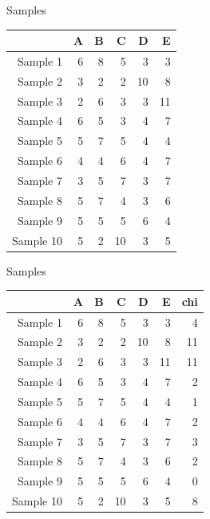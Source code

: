 \documentclass{beamer}
\begin{document}
\begin{frame}{Samples}

\begin{table}[ht]
\centering
\begin{tabular}{rrrrrr}
  \hline
 & A & B & C & D & E \\ 
  \hline
Sample 1 & 6 & 8 & 5 & 3 & 3 \\ 
  Sample 2 & 3 & 2 & 2 & 10 & 8 \\ 
  Sample 3 & 2 & 6 & 3 & 3 & 11 \\ 
  Sample 4 & 6 & 5 & 3 & 4 & 7 \\ 
  Sample 5 & 5 & 7 & 5 & 4 & 4 \\ 
  Sample 6 & 4 & 4 & 6 & 4 & 7 \\ 
  Sample 7 & 3 & 5 & 7 & 3 & 7 \\ 
  Sample 8 & 5 & 7 & 4 & 3 & 6 \\ 
  Sample 9 & 5 & 5 & 5 & 6 & 4 \\ 
  Sample 10 & 5 & 2 & 10 & 3 & 5 \\ 
   \hline
\end{tabular}
\end{table}

\end{frame}

\begin{frame}{Samples}
\begin{table}[ht]
\centering
\begin{tabular}{rrrrrrr}
  \hline
 & A & B & C & D & E & chi \\ 
  \hline
Sample 1 & 6 & 8 & 5 & 3 & 3 & 4 \\ 
  Sample 2 & 3 & 2 & 2 & 10 & 8 & 11 \\ 
  Sample 3 & 2 & 6 & 3 & 3 & 11 & 11 \\ 
  Sample 4 & 6 & 5 & 3 & 4 & 7 & 2 \\ 
  Sample 5 & 5 & 7 & 5 & 4 & 4 & 1 \\ 
  Sample 6 & 4 & 4 & 6 & 4 & 7 & 2 \\ 
  Sample 7 & 3 & 5 & 7 & 3 & 7 & 3 \\ 
  Sample 8 & 5 & 7 & 4 & 3 & 6 & 2 \\ 
  Sample 9 & 5 & 5 & 5 & 6 & 4 & 0 \\ 
  Sample 10 & 5 & 2 & 10 & 3 & 5 & 8 \\ 
   \hline
\end{tabular}
\end{table}

\end{frame}
\end{document}
